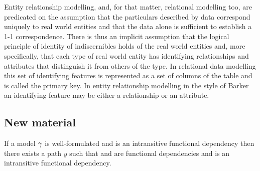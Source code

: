 Entity relationship modelling, and, for that matter, relational modelling too, are predicated on the assumption that the particulars described by data correspond uniquely to real world entities and that the data alone is sufficient to establish a 1-1 correspondence. There is thus an implicit assumption that the logical principle of identity of indiscernibles holds of the real world entities and, more specifically, that each type of real world entity has identifying relationships and attributes that distinguish it from  others of the type. In relational data modelling this set of identifying features is represented as a set of columns of the table and is called the primary key. In entity relationship modelling in the style of Barker an identifying feature may be either a relationship or an attribute.   

\subsection{New material}
\begin{lemma}
If a model $\gamma$ is well-formulated and  is an intransitive functional dependency then there exists a path $y$
such that  and  are functional dependencies and  is an intransitive functional dependency.
\end{lemma}



